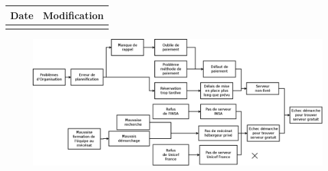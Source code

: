 \begin{table}[H]

\centering

	\begin{tabularx}{16.8cm}{|X|X|}

	\hline

	Date & Modification \\

	\hline

	  & \\

	\hline

	\end{tabularx}

\end{table}

\newpage


\begin{figure}
	\centering
	\includegraphics[scale=0.25]{images/AnalyseRisque_nPourquoi_FDO009.png}
\end{figure}
